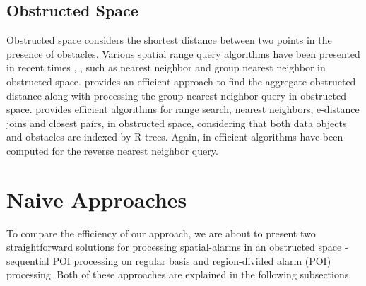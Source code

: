 \documentclass{sig-alternate}
\begin{document}
\subsection{Obstructed Space} 
Obstructed space considers the shortest distance between two points in the presence of obstacles. Various spatial range query algorithms have been presented in recent times \cite{obst1}, \cite{obst2}, \cite{ognn} such as nearest neighbor and group nearest neighbor in obstructed space.\cite{ognn} provides an efficient approach to find the aggregate obstructed distance along with processing the group nearest neighbor query in obstructed space. \cite{obst1} provides efficient algorithms for range search, nearest neighbors, e-distance joins and closest pairs, in obstructed space, considering that both data objects and obstacles are indexed by R-trees. Again, in \cite{obst2} efficient algorithms have been computed for the reverse nearest neighbor query.
\\

\section{Naive Approaches}
To compare the efficiency of our approach, we are about to present two straightforward solutions for processing spatial-alarms in an obstructed space - sequential POI processing on regular basis and region-divided alarm (POI) processing.
Both of these approaches are explained in the following subsections.
\end{document}
